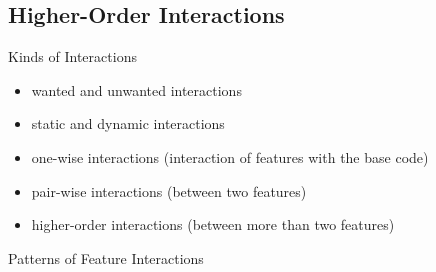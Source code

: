 \subsection{Higher-Order Interactions}
\begin{frame}{\myframetitle}
	\begin{mycolumns}
		\begin{definition}{Kinds of Interactions}
			\begin{itemize}
				\item wanted and unwanted interactions
				\item static and dynamic interactions
				\item one-wise interactions (interaction of features with the base code)
				\item pair-wise interactions (between two features)
				\item higher-order interactions (between more than two features)
			\end{itemize}
		\end{definition}
	\mynextcolumn
		\begin{exampletight}{Patterns of Feature Interactions\mysource{\VBDb}}
		\end{exampletight}
	\end{mycolumns}
\end{frame}

